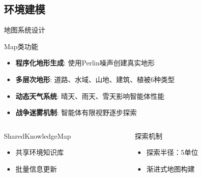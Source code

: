 \documentclass[
10pt,
aspectratio=169,
]{beamer}
\begin{document}
\subsection{环境建模}

\begin{frame}{地图系统设计}
    \begin{block}{Map类功能}
        \begin{itemize}
            \item \textbf{程序化地形生成}: 使用Perlin噪声创建真实地形
            \item \textbf{多层次地形}: 道路、水域、山地、建筑、植被6种类型
            \item \textbf{动态天气系统}: 晴天、雨天、雪天影响智能体性能
            \item \textbf{战争迷雾机制}: 智能体有限视野逐步探索
        \end{itemize}
    \end{block}
    
    \begin{columns}
        \begin{column}{0.5\textwidth}
            \begin{exampleblock}{SharedKnowledgeMap}
                \begin{itemize}
                    \item 共享环境知识库
                    \item 批量信息更新
                \end{itemize}
            \end{exampleblock}
        \end{column}
        \begin{column}{0.5\textwidth}
            \begin{alertblock}{探索机制}
                \begin{itemize}
                    \item 探索半径：5单位
                    \item 渐进式地图构建
                \end{itemize}
            \end{alertblock}
        \end{column}
    \end{columns}
\end{frame}
\end{document}
